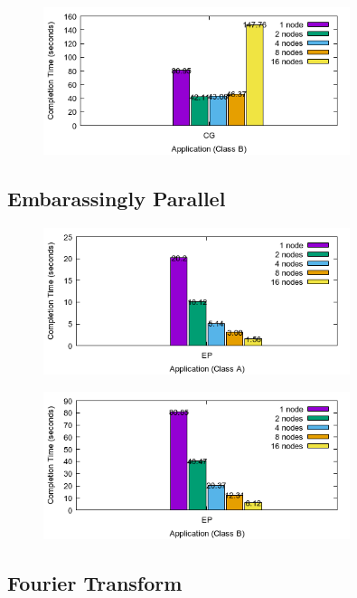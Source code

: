 \documentclass[a4paper]{article}
\begin{document}
\begin{figure}[H]
\centering
\includegraphics[width=0.8\textwidth]{figures/CGvB.png}
\caption{\label{fig:CGvB}}
\end{figure}

\subsection{Embarassingly Parallel}

\begin{figure}[H]
\centering
\includegraphics[width=0.8\textwidth]{figures/EPvA.png}
\caption{\label{fig:EPvA}}
\end{figure}

\begin{figure}[H]
\centering
\includegraphics[width=0.8\textwidth]{figures/EPvB.png}
\caption{\label{fig:EPvB}}
\end{figure}


\subsection{Fourier Transform}
\end{document}
